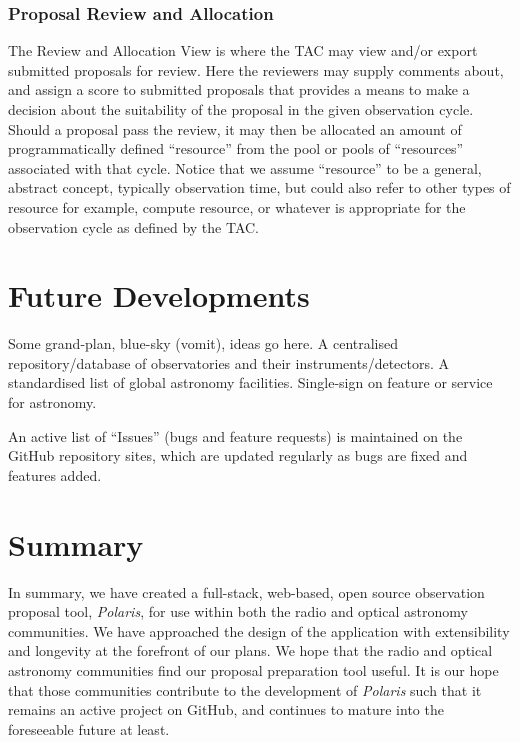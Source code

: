 \documentclass[11pt,twoside]{article}
\begin{document}
\subsubsection{Proposal Review and Allocation}\label{subsubsec:proposal-review-and-allocation}


The Review and Allocation View is where the TAC may view and/or export submitted proposals for review.
Here the reviewers may supply comments about, and assign a score to submitted proposals that provides a means
to make a decision about the suitability of the proposal in the given observation cycle.
Should a proposal pass the review, it may then be allocated an amount of programmatically defined ``resource''
from the pool or pools of ``resources'' associated with that cycle.
Notice that we assume ``resource'' to be a general, abstract concept, typically observation
time, but could also refer to other types of resource for example, compute resource, or
whatever is appropriate for the observation cycle as defined by the TAC.\@


\section{Future Developments}\label{sec:future-developments}

Some grand-plan, blue-sky (vomit), ideas go here.
A centralised repository/database of observatories and their instruments/detectors.
A standardised list of global astronomy facilities.
Single-sign on feature or service for astronomy.

An active list of ``Issues'' (bugs and feature requests) is maintained on the GitHub repository sites, which
are updated regularly as bugs are fixed and features added.


\section{Summary}\label{sec:summary}
In summary, we have created a full-stack, web-based, open source observation proposal tool, \emph{Polaris},
for use within both the radio and optical astronomy communities.
We have approached the design of the application with extensibility and longevity at the forefront of
our plans.
We hope that the radio and optical astronomy communities find our proposal preparation tool useful.
It is our hope that those communities contribute to the development of \emph{Polaris} such that it remains an
active project on GitHub, and continues to mature into the foreseeable future at least.
\end{document}
